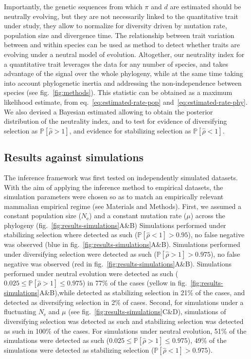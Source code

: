 \documentclass{article}
\newcommand{\Ne}{N_{\text{e}}}
\newcommand{\proba}{\mathbb{P}}
\newcommand{\MutationRate}{\mu}
\newcommand{\EstNI}{\widehat{\rho}}
\begin{document}
Importantly, the genetic sequences from which $\pi$ and $d$ are estimated should be neutrally evolving, but they are not necessarily linked to the quantitative trait under study, they allow to normalize for diversity driven by mutation rate, population size and divergence time.
The relationship between trait variation between and within species can be used as method to detect whether traits are evolving under a neutral model of evolution.
Altogether, our neutrality index for a quantitative trait leverages the data for any number of species, and takes advantage of the signal over the whole phylogeny, while at the same time taking into account phylogenetic inertia and addressing the non-independence between species (see fig.~\ref{fig:methods}).
This statistic can be obtained as a maximum likelihood estimate, from eq.~\ref{eq:estimated-rate-pop} and~\ref{eq:estimated-rate-phy}.
We also devised a Bayesian estimated allowing to obtain the posterior distribution of the neutrality index, and to test for evidence of diversifying selection as $\proba [\EstNI > 1]$, and evidence for stabilizing selection as $\proba [\EstNI < 1]$.

\subsection*{Results against simulations}\label{subsec:results-against-simulations}

The inference framework was first tested on independently simulated datasets.
With the aim of applying the inference method to empirical datasets, the simulation parameters were chosen so as to match an empirically relevant mammalian empirical regime (see Materials and Methods).
First, we assumed a constant population size ($\Ne$) and a constant mutation rate ($\MutationRate$) across the phylogeny (fig.~\ref{fig:results-simulations}A\&B)
Simulations performed under stabilizing selection where detected as such ($\proba [\EstNI < 1] > 0.95$), no false negative was observed (blue in fig.~\ref{fig:results-simulations}A\&B).
Simulations performed under diversifying selection were detected as such ($\proba [\EstNI > 1] > 0.975$), no false negative was observed (red in fig.~\ref{fig:results-simulations}A\&B).
Simulations performed under neutral evolution were detected as such ($0.025 \leq \proba [\EstNI > 1] \leq 0.975$) in 77\% of the cases (yellow in fig.~\ref{fig:results-simulations}A\&B),while detected as stabilizing selection in 21\% of the cases, and detected as diversifying selection in 2\% of cases.
Second, for simulations under a fluctuating $\Ne$ and $\MutationRate$ (see fig.~\ref{fig:results-simulations}C\&D), simulations of diversifying selection was detected as such and stabilizing selection was detected as such in 100\% of the cases.
For simulations under neutral evolution, 51\% of the simulations were detected as such ($0.025 \leq \proba [\EstNI > 1] \leq 0.975$), 49\% of the simulations were detected as stabilizing selection ($\proba [\EstNI < 1] > 0.975$).
\end{document}
